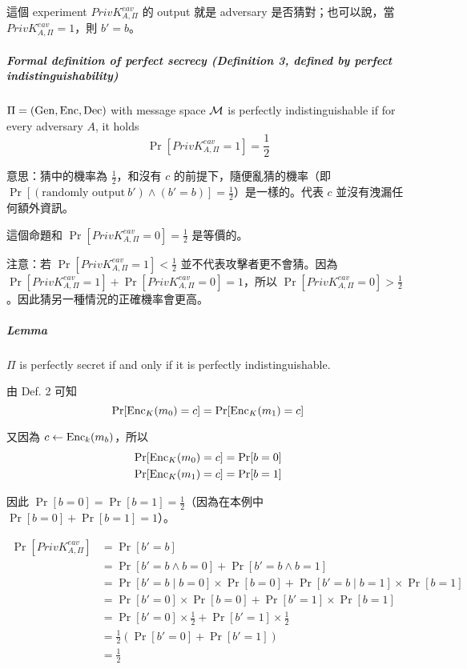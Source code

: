 這個 experiment \(PrivK_{A, \Pi}^{eav}\) 的 output 就是 adversary 是否猜對；也可以說，當 \(PrivK_{A, \Pi}^{eav} = 1\)，則 \(b' = b\)。


\subparagraph{Formal definition of perfect secrecy (\textbf{Definition 3, defined by perfect indistinguishability})}

\(\Pi = (\operatorname{Gen}, \operatorname{Enc}, \operatorname{Dec})\) with message space \(\operatorname{\mathcal{M}}\) is perfectly indistinguishable if for every adversary \(A\), it holds
\[\Pr[PrivK_{A, \Pi}^{eav} = 1] = \frac{1}{2}\]

意思：猜中的機率為 \(\frac{1}{2}\)，和沒有 \(c\) 的前提下，隨便亂猜的機率（即 \(\Pr[(\text{randomly output} \ b' ) \wedge (b' = b)] = \frac{1}{2}\)）是一樣的。代表 \(c\) 並沒有洩漏任何額外資訊。

這個命題和 \(\Pr[PrivK_{A, \Pi}^{eav} = 0] = \frac{1}{2}\) 是等價的。

注意：若 \(\Pr[PrivK_{A, \Pi}^{eav} = 1] < \frac{1}{2}\) 並不代表攻擊者更不會猜。因為 \(\Pr[PrivK_{A, \Pi}^{eav} = 1] + \Pr[PrivK_{A, \Pi}^{eav} = 0] = 1\)，所以 \(\Pr[PrivK_{A, \Pi}^{eav} = 0] > \frac{1}{2}\)。因此猜另一種情況的正確機率會更高。

\subparagraph{Lemma}

\(\Pi\) is perfectly secret if and only if it is perfectly indistinguishable.

\begin{myProof}
	由 Def. 2 可知
	\[
		\Pr[\operatorname{Enc}_K(m_0) = c] = \Pr[\operatorname{Enc}_K(m_1) = c]
	\]
	
	又因為 \(c \leftarrow \operatorname{Enc}_k(m_b)\)，所以
	\begin{align*}
		\Pr[\operatorname{Enc}_K(m_0) = c] = \Pr[b = 0] \\
		\Pr[\operatorname{Enc}_K(m_1) = c] = \Pr[b = 1]
	\end{align*}
	
	因此 \(\Pr[b = 0] = \Pr[b = 1] = \displaystyle\frac{1}{2}\)（因為在本例中 \(\Pr[b = 0] + \Pr[b = 1] = 1\)）。
	
	\begin{align*}
		\Pr[PrivK_{A, \Pi}^{eav}] &= \Pr[b' = b] \\
		&= \Pr[b' = b \wedge b = 0] + \Pr[b' = b \wedge b = 1] \tag{rewrite} \\
		&= \Pr[b' = b \mid b = 0] \times \Pr[b = 0] + \Pr[b' = b \mid b = 1] \times \Pr[b = 1] \tag{rewrite} \\
		&= \Pr[b' = 0]  \times \Pr[b = 0] + \Pr[b' = 1] \times \Pr[b = 1] \tag{rewrite} \\
		&= \Pr[b' = 0]  \times \frac{1}{2} + \Pr[b' = 1] \times \frac{1}{2} \tag{by Def. 2 denoted above} \\
		&= \frac{1}{2}(\Pr[b' = 0] + \Pr[b' = 1]) \\
		&= \frac{1}{2}	\tag{\(\because \Pr[b' = 0] + \Pr[b' = 1] = 1\)}
	\end{align*}
\end{myProof}

